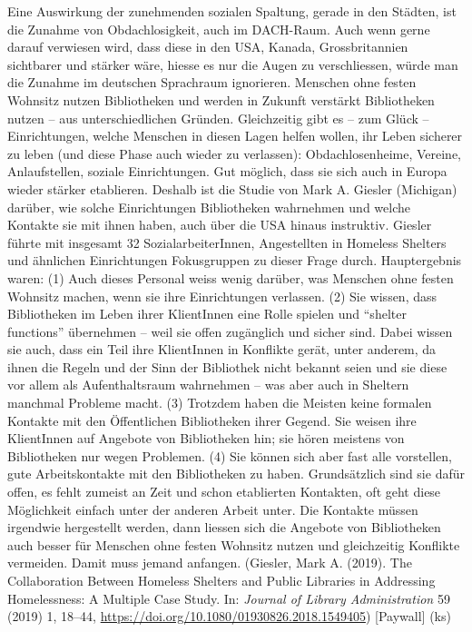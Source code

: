 \documentclass[a4paper,
fontsize=11pt,
oneside,
numbers=noperiodatend,
parskip=half-,
bibliography=totoc,
final
]{scrartcl}
\begin{document}
Eine Auswirkung der zunehmenden sozialen Spaltung, gerade in den
Städten, ist die Zunahme von Obdachlosigkeit, auch im DACH-Raum. Auch
wenn gerne darauf verwiesen wird, dass diese in den USA, Kanada,
Grossbritannien sichtbarer und stärker wäre, hiesse es nur die Augen zu
verschliessen, würde man die Zunahme im deutschen Sprachraum ignorieren.
Menschen ohne festen Wohnsitz nutzen Bibliotheken und werden in Zukunft
verstärkt Bibliotheken nutzen -- aus unterschiedlichen Gründen.
Gleichzeitig gibt es -- zum Glück -- Einrichtungen, welche Menschen in
diesen Lagen helfen wollen, ihr Leben sicherer zu leben (und diese Phase
auch wieder zu verlassen): Obdachlosenheime, Vereine, Anlaufstellen,
soziale Einrichtungen. Gut möglich, dass sie sich auch in Europa wieder
stärker etablieren. Deshalb ist die Studie von Mark A. Giesler
(Michigan) darüber, wie solche Einrichtungen Bibliotheken wahrnehmen und
welche Kontakte sie mit ihnen haben, auch über die USA hinaus
instruktiv. Giesler führte mit insgesamt 32 SozialarbeiterInnen,
Angestellten in Homeless Shelters und ähnlichen Einrichtungen
Fokusgruppen zu dieser Frage durch. Hauptergebnis waren: (1) Auch dieses
Personal weiss wenig darüber, was Menschen ohne festen Wohnsitz machen,
wenn sie ihre Einrichtungen verlassen. (2) Sie wissen, dass Bibliotheken
im Leben ihrer KlientInnen eine Rolle spielen und \enquote{shelter
functions} übernehmen -- weil sie offen zugänglich und sicher sind.
Dabei wissen sie auch, dass ein Teil ihre KlientInnen in Konflikte
gerät, unter anderem, da ihnen die Regeln und der Sinn der Bibliothek
nicht bekannt seien und sie diese vor allem als Aufenthaltsraum
wahrnehmen -- was aber auch in Sheltern manchmal Probleme macht. (3)
Trotzdem haben die Meisten keine formalen Kontakte mit den Öffentlichen
Bibliotheken ihrer Gegend. Sie weisen ihre KlientInnen auf Angebote von
Bibliotheken hin; sie hören meistens von Bibliotheken nur wegen
Problemen. (4) Sie können sich aber fast alle vorstellen, gute
Arbeitskontakte mit den Bibliotheken zu haben. Grundsätzlich sind sie
dafür offen, es fehlt zumeist an Zeit und schon etablierten Kontakten,
oft geht diese Möglichkeit einfach unter der anderen Arbeit unter. Die
Kontakte müssen irgendwie hergestellt werden, dann liessen sich die
Angebote von Bibliotheken auch besser für Menschen ohne festen Wohnsitz
nutzen und gleichzeitig Konflikte vermeiden. Damit muss jemand anfangen.
(Giesler, Mark A. (2019). The Collaboration Between Homeless Shelters
and Public Libraries in Addressing Homelessness: A Multiple Case Study.
In: \emph{Journal of Library Administration} 59 (2019) 1, 18--44,
\url{https://doi.org/10.1080/01930826.2018.1549405}) {[}Paywall{]} (ks)
\end{document}
